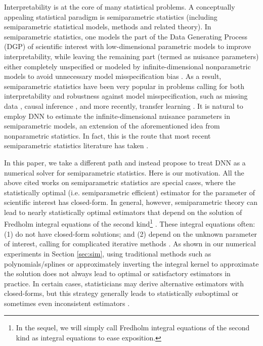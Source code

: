 \documentclass{article}
\theoremstyle{plain}
\theoremstyle{definition}
\theoremstyle{remark}
\begin{document}
Interpretability is at the core of many statistical problems. A conceptually appealing statistical paradigm is semiparametric statistics (including semiparametric statistical models, methods and related theory). In semiparametric statistics, one models the part of the Data Generating Process (DGP) of scientific interest with low-dimensional parametric models to improve interpretability, while leaving the remaining part (termed as nuisance parameters) either completely unspecified or modeled by infinite-dimensional nonparametric models to avoid unnecessary model misspecification bias \citep{newey1990semiparametric, bickel1998efficient}. As a result, semiparametric statistics have been very popular in problems calling for both interpretability and robustness against model misspecification, such as missing data \citep{robins1994estimation}, causal inference \citep{van2003unified}, and more recently, transfer learning \citep{qiu2023efficient, tian2023elsa}. It is natural to employ DNN to estimate the infinite-dimensional nuisance parameters in semiparametric models, an extension of the aforementioned idea from nonparametric statistics. In fact, this is the route that most recent semiparametric statistics literature has taken \citep{farrell2021deep, shi2021double, zhong2022deep, xu2022deepmed, kompa2022deep, chernozhukov2022riesznet, chen2023efficient, chen2024causal}. 

In this paper, we take a different path and instead propose to treat DNN as a numerical solver for semiparametric statistics. Here is our motivation. All the above cited works on semiparametric statistics are special cases, where the statistically optimal (i.e. semiparametric efficient) estimator for the parameter of scientific interest has closed-form. In general, however, semiparametric theory can lead to nearly statistically optimal estimators that depend on the solution of Fredholm integral equations of the second kind\footnote{In the sequel, we will simply call Fredholm integral equations of the second kind as integral equations to ease exposition.} \citep{bickel1998efficient}. These integral equations often: (1) do not have closed-form solutions; and (2) depend on the unknown parameter of interest, calling for complicated iterative methods \citep{robins1994estimation}. As shown in our numerical experiments in Section \ref{sec:sim}, using traditional methods such as polynomials/splines \citep{bellour2016two} or approximately inverting the integral kernel \citep{atkinson1967numerical} to approximate the solution does not always lead to optimal or satisfactory estimators in practice. In certain cases, statisticians may derive alternative estimators with closed-forms, but this strategy generally leads to statistically suboptimal or sometimes even inconsistent estimators \citep{zhao2022versatile, liu2021efficient, yang2022semiparametric}.
\end{document}
